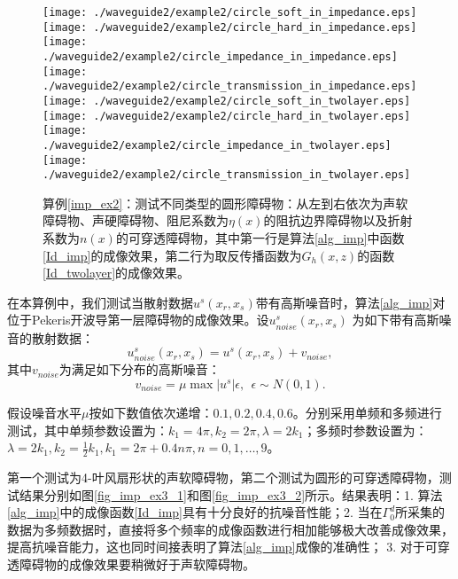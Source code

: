 \begin{figure}[htbp]
  \centering
  \texttt{[image: ./waveguide2/example2/circle\_soft\_in\_impedance.eps]}
  \texttt{[image: ./waveguide2/example2/circle\_hard\_in\_impedance.eps]}
  \texttt{[image: ./waveguide2/example2/circle\_impedance\_in\_impedance.eps]}
  \texttt{[image: ./waveguide2/example2/circle\_transmission\_in\_impedance.eps]}
  \texttt{[image: ./waveguide2/example2/circle\_soft\_in\_twolayer.eps]}
  \texttt{[image: ./waveguide2/example2/circle\_hard\_in\_twolayer.eps]}
  \texttt{[image: ./waveguide2/example2/circle\_impedance\_in\_twolayer.eps]}
  \texttt{[image: ./waveguide2/example2/circle\_transmission\_in\_twolayer.eps]}
  \caption{算例\ref{imp_ex2}：测试不同类型的圆形障碍物：从左到右依次为声软障碍物、声硬障碍物、阻尼系数为$\eta(x)$的阻抗边界障碍物以及折射系数为$n(x)$的可穿透障碍物，其中第一行是算法\ref{alg_imp}中函数\ref{Id_imp}的成像效果，第二行为取反传播函数为$G_h(x,z)$的函数\ref{Id_twolayer}的成像效果。}\label{fig_imp_ex2}
\end{figure}
\begin{example}[抗噪性单频测试]\label{imp_ex3}
在本算例中，我们测试当散射数据$u^s(x_r,x_s)$带有高斯噪音时，算法\ref{alg_imp}对位于Pekeris开波导第一层障碍物的成像效果。设$u^s_{noise}(x_r,x_s)$ 为如下带有高斯噪音的散射数据：
$$ u^s_{noise}(x_r,x_s)=u^s(x_r,x_s)+v_{noise},$$
其中$v_{noise}$为满足如下分布的高斯噪音：
$$v_{noise}=\mu \max{|u^s|}\epsilon,\ \ \epsilon\sim N(0,1).$$

假设噪音水平$\mu$按如下数值依次递增：$0.1,0.2,0.4,0.6$。分别采用单频和多频进行测试，其中单频参数设置为：$k_1=4\pi,k_2=2\pi,\lambda=2k_1$；多频时参数设置为：$\lambda=2k_1,k_2=\frac{1}{2}k_1,k_1=2\pi+0.4n\pi,n=0,1,\ldots,9$。

第一个测试为4-叶风扇形状的声软障碍物，第二个测试为圆形的可穿透障碍物，测试结果分别如图\ref{fig_imp_ex3_1}和图\ref{fig_imp_ex3_2}所示。结果表明：1. 算法\ref{alg_imp}中的成像函数\eqref{Id_imp}具有十分良好的抗噪音性能；2. 当在$\Gamma_0^d$所采集的数据为多频数据时，直接将多个频率的成像函数进行相加能够极大改善成像效果，提高抗噪音能力，这也同时间接表明了算法\ref{alg_imp}成像的准确性； 3. 对于可穿透障碍物的成像效果要稍微好于声软障碍物。
\end{example}

